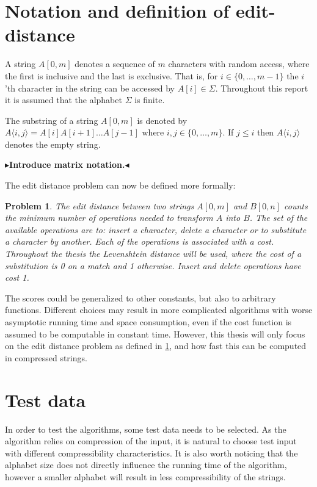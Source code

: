 \documentclass[twoside,11pt,openright]{report}
\newcommand{\todo}[1]{{\color[rgb]{.5,0,0}\textbf{$\blacktriangleright$#1$\blacktriangleleft$}}}
\newcommand{\substr}[3]{#1\langle #2, #3 \rangle}
\newcommand{\str}[3]{#1[#2, #3]}
\newtheorem{problem}{Problem}
\begin{document}
\section{Notation and definition of edit-distance}
A string $\str{A}{0}{m}$ denotes a sequence of $m$ characters with random access, where the first is inclusive and the last is exclusive. That is, for $i \in \{0, \dots, m - 1\}$ the $i$'th character in the string can be accessed by $A[i] \in \Sigma$. Throughout this report it is assumed that the alphabet $\Sigma$ is finite.

The substring of a string $\str{A}{0}{m}$ is denoted by $\substr{A}{i}{j} = A[i]A[i+1]\dots A[j - 1]$ where $i, j \in \{0, \dots, m\}$. If $j \leq i$ then $\substr{A}{i}{j}$ denotes the empty string.

\todo{Introduce matrix notation.}

The edit distance problem can now be defined more formally:
\begin{problem}
  \label{problem:edit-distance}
  The edit distance between two strings $\str{A}{0}{m}$ and $\str{B}{0}{n}$ counts the minimum number of operations needed to transform $A$ into $B$. The set of the available operations are to: insert a character, delete a character or to substitute a character by another. Each of the operations is associated with a cost. Throughout the thesis the Levenshtein distance will be used, where the cost of a substitution is 0 on a match and 1 otherwise. Insert and delete operations have cost 1.
\end{problem}
The scores could be generalized to other constants, but also to arbitrary functions. Different choices may result in more complicated algorithms with worse asymptotic running time and space consumption, even if the cost function is assumed to be computable in constant time. However, this thesis will only focus on the edit distance problem as defined in \cref{problem:edit-distance}, and how fast this can be computed in compressed strings.

\section{Test data}
\label{sec:intro:test-data}
In order to test the algorithms, some test data needs to be selected. As the algorithm relies on compression of the input, it is natural to choose test input with different compressibility characteristics. It is also worth noticing that the alphabet size does not directly influence the running time of the algorithm, however a smaller alphabet will result in less compressibility of the strings.
\end{document}
